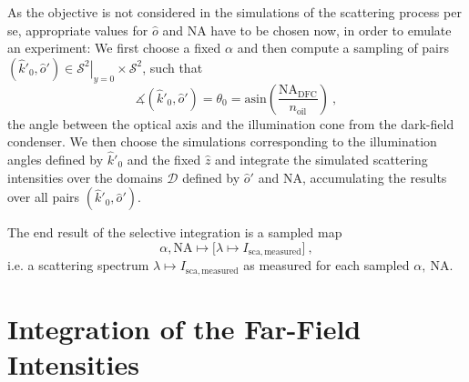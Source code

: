 \documentclass[10pt]{article}
\begin{document}

As the objective is not considered in the simulations of the scattering process per se, appropriate values for $\hat{o}$ and $\mathrm{NA}$ have to be chosen now, in order to emulate an experiment: 
We first choose a fixed $\alpha$ and then compute a sampling of pairs $\left( \hat{k}'_0 , \hat{o}' \right) \in \left. \mathcal{S}^2 \right\vert_{y=0} \times \mathcal{S}^2$, such that 
$$
    \measuredangle\!\left(\hat{k}'_0 , \hat{o}'\right) = \theta_0 = \mathrm{asin}\!\left( \frac{\mathrm{NA}_\mathrm{DFC}}{n_\mathrm{oil}} \right) \ , 
$$
the angle between the optical axis and the illumination cone from the dark-field condenser. 
We then choose the simulations corresponding to the illumination angles defined by $\hat{k}'_0$ and the fixed $\hat{z}$ and integrate the simulated scattering intensities over the domains $\mathcal{D}$ defined by $\hat{o}'$ and $\mathrm{NA}$, accumulating the results over all pairs $\left( \hat{k}'_0 , \hat{o}' \right)$.

The end result of the selective integration is a sampled map 
$$
    \alpha,\mathrm{NA} \mapsto \bigl[ \lambda \mapsto I_\mathrm{sca,measured} \bigr] \ ,
$$
i.e. a scattering spectrum $\lambda \mapsto I_\mathrm{sca,measured}$ as measured for each sampled $\alpha,\ \mathrm{NA}$. 






\section*{Integration of the Far-Field Intensities}
\end{document}
